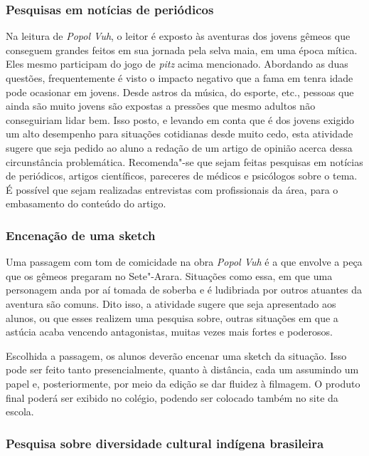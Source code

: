 \documentclass[11pt]{extarticle}
\begin{document}
\subsubsection{Pesquisas em notícias de periódicos}

  Na leitura de \emph{Popol Vuh}, o leitor é exposto às aventuras dos
  jovens gêmeos que conseguem grandes feitos em sua jornada pela selva
  maia, em uma época mítica. Eles mesmo participam do jogo de
  \emph{pitz} acima mencionado. Abordando as duas questões,
  frequentemente é visto o impacto negativo que a fama em tenra idade
  pode ocasionar em jovens. Desde astros da música, do esporte, etc.,
  pessoas que ainda são muito jovens são expostas a pressões que mesmo
  adultos não conseguiriam lidar bem. Isso posto, e levando em conta que
  é dos jovens exigido um alto desempenho para situações cotidianas
  desde muito cedo, esta atividade sugere que seja pedido ao aluno a
  redação de um artigo de opinião acerca dessa circunstância
  problemática. Recomenda"-se que sejam feitas pesquisas em notícias de
  periódicos, artigos científicos, pareceres de médicos e psicólogos
  sobre o tema. É possível que sejam realizadas entrevistas com
  profissionais da área, para o embasamento do conteúdo do artigo.

\subsubsection{Encenação de uma sketch}

  Uma passagem com tom de comicidade na obra \textit{Popol Vuh} é a que envolve a
  peça que os gêmeos pregaram no Sete"-Arara. Situações como essa, em que
  uma personagem anda por aí tomada de soberba e é ludibriada por outros
  atuantes da aventura são comuns. Dito isso, a atividade sugere que
  seja apresentado aos alunos, ou que esses realizem uma pesquisa sobre,
  outras situações em que a astúcia acaba vencendo antagonistas, muitas
  vezes mais fortes e poderosos. 

  Escolhida a passagem, os alunos deverão
  encenar uma sketch da situação. Isso pode ser feito tanto
  presencialmente, quanto à distância, cada um assumindo um papel e,
  posteriormente, por meio da edição se dar fluidez à filmagem. O
  produto final poderá ser exibido no colégio, podendo ser colocado
  também no site da escola.

\subsubsection{Pesquisa sobre diversidade cultural indígena brasileira}
\end{document}
